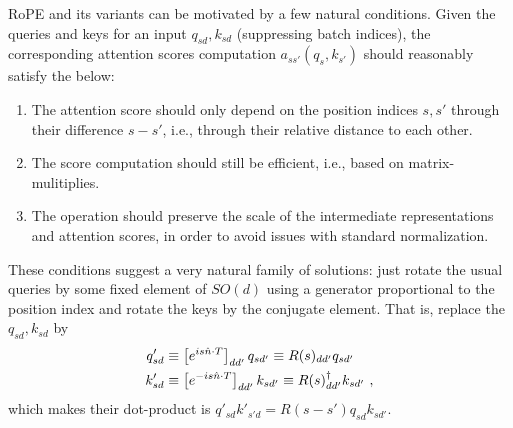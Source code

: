 RoPE and its variants can be motivated by a few natural conditions.  Given the queries and keys for
an input $ q _{ sd }, k _{ sd } $ (suppressing batch indices), the corresponding attention scores
computation $ a _{ ss' }\left ( q _{ s }, k _{ s' } \right ) $ should reasonably satisfy the below:
\begin{enumerate}
	\item The attention score should only depend on the position indices $ s, s' $ through their difference
	      $ s-s' $, i.e., through their relative distance to each other.
	\item The score computation should still be efficient, i.e., based on matrix-mulitiplies.
	\item The operation should preserve the scale of the intermediate representations and attention
	      scores, in order to avoid issues with standard normalization.
\end{enumerate}
These conditions suggest a very natural family of solutions: just rotate the usual queries by some fixed
element of $ SO(d) $ using a generator proportional to the position index and rotate the keys by the
conjugate element. That is, replace the $ q _{ sd }, k _{ sd } $   by
\begin{align}
    q' _{ sd }&\equiv  \left [e^{ i s \hat{n}\cdot T }\right ]_{ d d' } q _{ sd' } \equiv R(s) _{ d d' } q _{ sd' } \nonumber\\
    k' _{ sd }&\equiv  \left [e^{ -i s \hat{n}\cdot T }\right ]_{ d d' } k _{ sd' } \equiv  R(s)^{ \dagger } _{ d d' } k _{ sd' } \ , \label{eq_rope}
\end{align}
which makes their dot-product is $ q' _{ sd } k' _{ s'd } = R(s-s') q _{ sd } k _{ sd' }  $.

